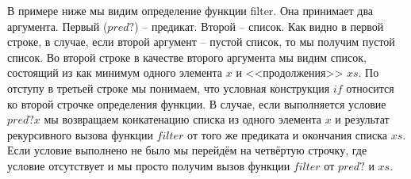     В примере ниже мы видим определение функции filter.
    Она принимает два аргумента.
    Первый ($pred?$) -- предикат. 
    Второй -- список.
    Как видно в первой строке, в случае, если второй аргумент -- пустой список, то мы получим пустой список.
    Во второй строке в качестве второго аргумента мы видим список, состоящий из как минимум одного элемента $x$ и <<продолжения>> $xs$.
    По отступу в третьей строке мы понимаем, что условная конструкция $if$ относится ко второй строчке определения функции.
    В случае, если выполняется условие $pred? x$ мы возвращаем конкатенацию списка из одного элемента $x$ и результат рекурсивного вызова функции $filter$ от того же предиката и окончания списка $xs$.
    Если условие выполнено не было мы перейдём на четвёртую строчку, где условие отсутствует и мы просто получим вызов функции $filter$ от $pred?$ и $xs$.

    
